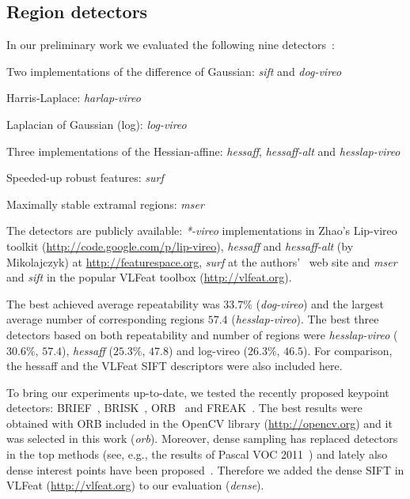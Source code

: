 \documentclass[journal]{IEEEtran}
\begin{document}
%
\subsection{Region detectors}
%
In our preliminary work we evaluated the following nine
detectors~\cite{LanKanKam:2012}:
\begin{compactenum}
\item Two implementations of the difference of Gaussian: \textit{sift} and \textit{dog-vireo}
\item Harris-Laplace: \textit{harlap-vireo}
\item Laplacian of Gaussian (log): \textit{log-vireo}
\item Three implementations of the Hessian-affine: \textit{hessaff}, \textit{hessaff-alt} and \textit{hesslap-vireo} 
\item Speeded-up robust features: \textit{surf}
\item Maximally stable extramal regions: \textit{mser}
\end{compactenum}
The detectors are publicly available:
 \textit{*-vireo} implementations in Zhao's
Lip-vireo toolkit (\url{http://code.google.com/p/lip-vireo}),
\textit{hessaff} and \textit{hessaff-alt} (by Mikolajczyk) at
\url{http://featurespace.org}, \textit{surf} at the
authors'~\cite{BayEssTuy:2008} web site and \textit{mser} and \textit{sift} in
the popular VLFeat toolbox (\url{http://vlfeat.org}).

The best achieved average repeatability was $33.7\%$ (\textit{dog-vireo}) and the
largest average number of corresponding regions $57.4$ (\textit{hesslap-vireo}). The
best three detectors based on both repeatability and number of regions were
\textit{hesslap-vireo} ($30.6\%$, $57.4$), \textit{hessaff} ($25.3\%$, $47.8$) and
log-vireo ($26.3\%$, $46.5$). For comparison, the hessaff and the VLFeat
SIFT descriptors were also included here.

To bring our experiments up-to-date, we tested the recently proposed keypoint
detectors: BRIEF~\cite{brief}, BRISK~\cite{brisk}, ORB~\cite{orb} and
FREAK~\cite{freak}. The best results were obtained with ORB included in
the OpenCV library (\url{http://opencv.org}) and it was
selected in this work (\textit{orb}). Moreover,
dense sampling has replaced detectors in the top methods
(see, e.g., the results of Pascal VOC 2011~\cite{VOC:2011}) and lately
also dense interest points have been proposed~\cite{Tuy:2010}. Therefore
we added the dense SIFT in VLFeat (\url{http://vlfeat.org})
to our evaluation (\textit{dense}).
\end{document}
